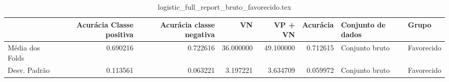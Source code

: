 \begin{table}
\centering
\caption{logistic_full_report_bruto_favorecido.tex}
\label{logistic_full_report_bruto_favorecido.tex}
\begin{tabular}{lrrrrrll}
\toprule
{} &  Acurácia Classe positiva &  Acurácia classe negativa &        VN  &   VP + VN  &  Acurácia & Conjunto de dados &       Grupo \\
\midrule
Média dos Folds &                  0.690216 &                  0.722616 &  36.000000 &  49.100000 &  0.712615 &    Conjunto bruto &  Favorecido \\
Desv. Padrão    &                  0.113561 &                  0.063221 &   3.197221 &   3.634709 &  0.059972 &    Conjunto bruto &  Favorecido \\
\bottomrule
\end{tabular}
\end{table}
